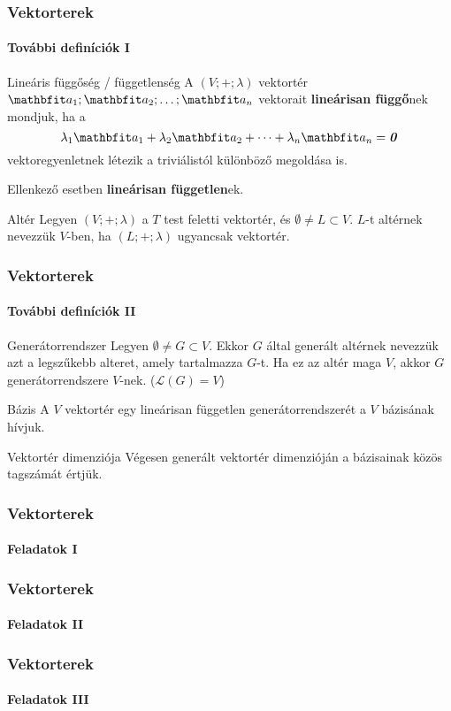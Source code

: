 \begin{frame}
  \frametitle{Vektorterek}
  \framesubtitle{További definíciók I}

  \begin{block}{Lineáris függőség / függetlenség}
    A $(V; +; \lambda)$ vektortér $\rvec a_1; \rvec a_2; \dots; \rvec a_n$
    vektorait \textbf{lineárisan függő}nek mondjuk, ha a
    \[
      \lambda_1 \rvec a_1 +
      \lambda_2 \rvec a_2 +
      \dots +
      \lambda_n \rvec a_n =
      \nvec
    \]
    vektoregyenletnek létezik a triviálistól különböző megoldása is.

    Ellenkező esetben \textbf{lineárisan független}ek.
  \end{block}

  \begin{block}{Altér}
    Legyen $(V; +; \lambda)$ a $T$ test feletti vektortér, és
    $\emptyset \neq L \subset V$. $L$-t altérnek nevezzük $V$-ben, ha
    $(L; +; \lambda)$ ugyancsak vektortér.
  \end{block}
\end{frame}

\begin{frame}
  \frametitle{Vektorterek}
  \framesubtitle{További definíciók II}

  \begin{block}{Generátorrendszer}
    Legyen $\emptyset \neq G \subset V$. Ekkor $G$ által generált altérnek
    nevezzük azt a legszűkebb alteret, amely tartalmazza $G$-t. Ha ez az
    altér maga $V$, akkor $G$ generátorrendszere $V$-nek. ($\mathcal L(G)=V$)
  \end{block}

  \begin{block}{Bázis}
    A $V$ vektortér egy lineárisan független generátorrendszerét a $V$ bázisának
    hívjuk.
  \end{block}

  \begin{block}{Vektortér dimenziója}
    Végesen generált vektortér dimenzióján a bázisainak közös tagszámát értjük.
  \end{block}
\end{frame}

\begin{frame}
  \frametitle{Vektorterek}
  \framesubtitle{Feladatok I}

  
\end{frame}

\begin{frame}
  \frametitle{Vektorterek}
  \framesubtitle{Feladatok II}

  
\end{frame}

\begin{frame}
  \frametitle{Vektorterek}
  \framesubtitle{Feladatok III}

  
\end{frame}
